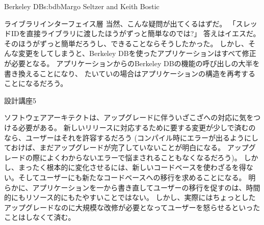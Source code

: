 \begin{aosachapter}{Berkeley DB}{s:bdb}{Margo Seltzer and Keith Bostic}
\begin{aosasect1}{ライブラリインターフェイス層}
当然、こんな疑問が出てくるはずだ。
「スレッドIDを直接ライブラリに渡したほうがずっと簡単なのでは?」
答えはイエスだ。そのほうがずっと簡単だろうし、できることならそうしたかった。
しかし、そんな変更をしてしまうと、Berkeley DBを使ったアプリケーションはすべて修正が必要となる。
アプリケーションからのBerkeley DBの機能の呼び出しの大半を書き換えることになり、
たいていの場合はアプリケーションの構造を再考することになるだろう。

\begin{aosabox}{設計講座5}

ソフトウェアアーキテクトは、アップグレードに伴ういざこざへの対応に気をつける必要がある。
新しいリリースに対応するために要する変更が少しで済むのなら、ユーザーはそれを許容するだろう
(コンパイル時にエラーが出るようにしておけば、まだアップグレードが完了していないことが明白になる。
アップグレードの際によくわからないエラーで悩まされることもなくなるだろう)。
しかし、まったく根本的に変化させるには、新しいコードベースを使わざるを得ない。そしてユーザーにも新たなコードベースへの移行を求めることになる。
明らかに、アプリケーションを一から書き直してユーザーの移行を促すのは、時間的にもリソース的にもたやすいことではない。
しかし、実際にはちょっとしたアップグレードなのに大規模な改修が必要となってユーザーを怒らせるといったことはしなくて済む。

\end{aosabox}


\end{aosasect1}
\end{aosachapter}
